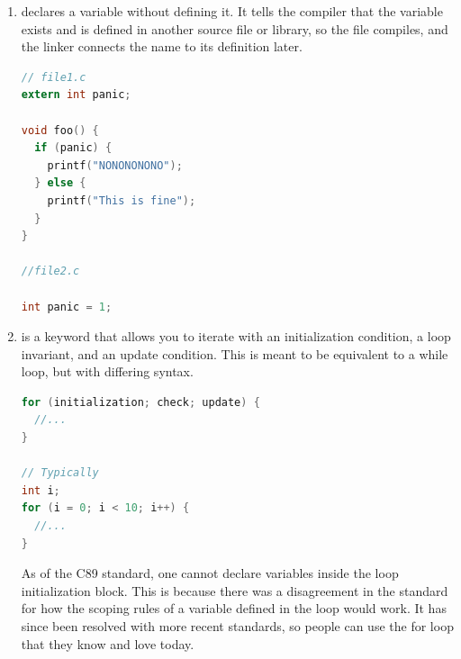 \begin{enumerate}
\begin{lstlisting}[language=C]
void process_day(enum day foo) {
  switch(foo) {
    case monday:
      printf("Go home!\n"); break;
    // ...
  }
}
\end{lstlisting}

	      It is completely possible to assign enum values to either be different or the same. It is not advisable to rely on the compiler for consistent numbering, if you assign numbers. If you are going to use this abstraction, try not to break it.

\begin{lstlisting}[language=C]
enum day{
  monday = 0,
  tuesday = 0,
  wednesday = 0,
  thursday = 1,
  friday = 10,
  saturday = 10,
  sunday = 0};

void process_day(enum day foo) {
  switch(foo) {
    case monday:
      printf("Go home!\n"); break;
    // ...
  }
}
\end{lstlisting}

	    \item {} declares a variable without defining it. It tells the compiler that the variable exists and is defined in another source file or library, so the file compiles, and the linker connects the name to its definition later.

\begin{lstlisting}[language=C]
// file1.c
extern int panic;

void foo() {
  if (panic) {
    printf("NONONONONO");
  } else {
    printf("This is fine");
  }
}

//file2.c

int panic = 1;
\end{lstlisting}

	    \item {} is a keyword that allows you to iterate with an initialization condition, a loop invariant, and an update condition.
        This is meant to be equivalent to a while loop, but with differing syntax.

\begin{lstlisting}[language=C]
for (initialization; check; update) {
  //...
}

// Typically
int i;
for (i = 0; i < 10; i++) {
  //...
}
\end{lstlisting}

	      As of the C89 standard, one cannot declare variables inside the  loop initialization block.
        This is because there was a disagreement in the standard for how the scoping rules of a variable defined in the loop would work.
        It has since been resolved with more recent standards, so people can use the for loop that they know and love today.


\end{enumerate}
